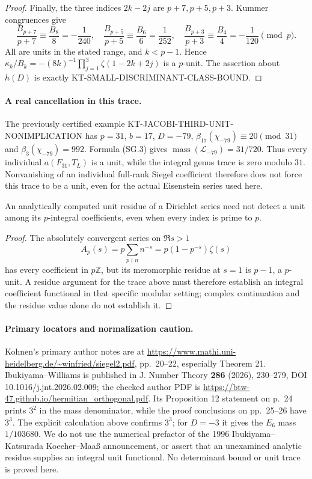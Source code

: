\begin{proof}
Finally, the three indices $2k-2j$ are $p+7,p+5,p+3$.
Kummer congruences give
\[
 \frac{B_{p+7}}{p+7}\equiv\frac{B_8}{8}=-\frac1{240},\quad
 \frac{B_{p+5}}{p+5}\equiv\frac{B_6}{6}=\frac1{252},\quad
 \frac{B_{p+3}}{p+3}\equiv\frac{B_4}{4}=-\frac1{120}
 \pmod p.
\]
All are units in the stated range, and $k<p-1$.  Hence
$\kappa_k/B_k=-(8k)^{-1}\prod_{j=1}^3\zeta(1-2k+2j)$ is a
$p$-unit.  The assertion about $h(D)$ is exactly
KT-SMALL-DISCRIMINANT-CLASS-BOUND.
\end{proof}

\paragraph{A real cancellation in this trace.}
The previously certified example
KT-JACOBI-THIRD-UNIT-NONIMPLICATION has $p=31$, $b=17$, $D=-79$,
$\beta_{17}(\chi_{-79})\equiv20\pmod{31}$ and
$\beta_3(\chi_{-79})=992$.  Formula (SG.3) gives
$\operatorname{mass}(\mathcal L_{-79})=31/720$.
Thus every individual $a(F_{31},T_L)$ is a unit, while the integral
genus trace is zero modulo $31$.  Nonvanishing of an individual
full-rank Siegel coefficient therefore does not force this trace to
be a unit, even for the actual Eisenstein series used here.

\begin{lemma}
An analytically computed unit residue of a Dirichlet series need not
detect a unit among its $p$-integral coefficients, even when every
index is prime to $p$.
\end{lemma}
\begin{proof}
The absolutely convergent series on $\Re s>1$
\[
 A_p(s)=p\sum_{p\nmid n}n^{-s}=p(1-p^{-s})\zeta(s)
\]
has every coefficient in $p\mathbb Z$, but its meromorphic residue
at $s=1$ is $p-1$, a $p$-unit.  A residue argument for the trace above
must therefore establish an integral coefficient functional in that
specific modular setting; complex continuation and the residue value
alone do not establish it.
\end{proof}

\paragraph{Primary locators and normalization caution.}
Kohnen's primary author notes are at
\url{https://www.mathi.uni-heidelberg.de/~winfried/siegel2.pdf},
pp.~20--22, especially Theorem 21.  Ibukiyama--Williams is published
in J. Number Theory \textbf{286} (2026), 230--279,
DOI 10.1016/j.jnt.2026.02.009; the checked author PDF is
\url{https://btw-47.github.io/hermitian_orthogonal.pdf}.
Its Proposition 12 statement on p.~24 prints $3^2$ in the mass
denominator, while the proof conclusions on pp.~25--26 have $3^3$.
The explicit calculation above confirms $3^3$; for $D=-3$ it gives
the $E_6$ mass $1/103680$.  We do not use the numerical prefactor of
the 1996 Ibukiyama--Katsurada Koecher--Maa\ss{} announcement, or
assert that an unexamined analytic residue supplies an integral unit
functional.  No determinant bound or unit trace is proved here.
